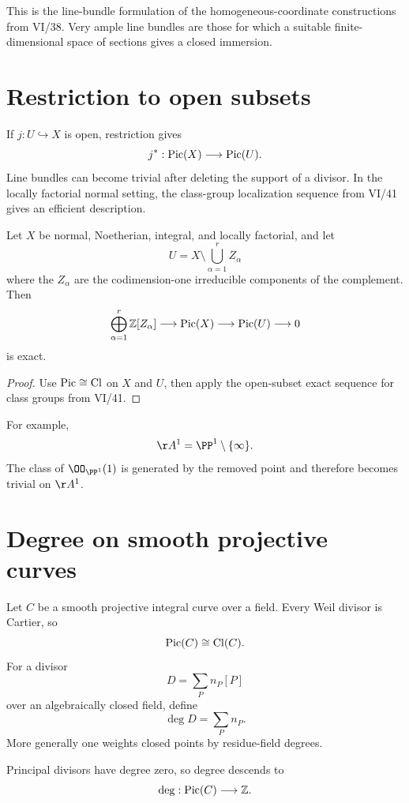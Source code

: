 This is the line-bundle formulation of the homogeneous-coordinate constructions from VI/38.  Very ample line bundles are those for which a suitable finite-dimensional space of sections gives a closed immersion.

\section{Restriction to open subsets}

If \(j:U\hookrightarrow X\) is open, restriction gives
\[
  j^*:\operatorname{Pic}(X)\longrightarrow\operatorname{Pic}(U).
\]
Line bundles can become trivial after deleting the support of a divisor.  In the locally factorial normal setting, the class-group localization sequence from VI/41 gives an efficient description.

\begin{proposition}\label{prop:vi42-restriction-divisors}
Let \(X\) be normal, Noetherian, integral, and locally factorial, and let
\[
  U=X\setminus\bigcup_{\alpha=1}^r Z_\alpha
\]
where the \(Z_\alpha\) are the codimension-one irreducible components of the complement.  Then
\[
  \bigoplus_{\alpha=1}^r\mathbb Z[Z_\alpha]
  \longrightarrow
  \operatorname{Pic}(X)
  \longrightarrow
  \operatorname{Pic}(U)
  \longrightarrow0
\]
is exact.
\end{proposition}

\begin{proof}
Use \(\operatorname{Pic}\cong\operatorname{Cl}\) on \(X\) and \(U\), then apply the open-subset exact sequence for class groups from VI/41.
\end{proof}

For example,
\[
  \AA^1=\PP^1\setminus\{\infty\}.
\]
The class of \(\OO_{\PP^1}(1)\) is generated by the removed point and therefore becomes trivial on \(\AA^1\).

\section{Degree on smooth projective curves}

Let \(C\) be a smooth projective integral curve over a field.  Every Weil divisor is Cartier, so
\[
  \operatorname{Pic}(C)\cong\operatorname{Cl}(C).
\]
For a divisor
\[
  D=\sum_P n_P[P]
\]
over an algebraically closed field, define
\[
  \deg D=\sum_P n_P.
\]
More generally one weights closed points by residue-field degrees.

Principal divisors have degree zero, so degree descends to
\[
  \deg:\operatorname{Pic}(C)\longrightarrow\mathbb Z.
\]

